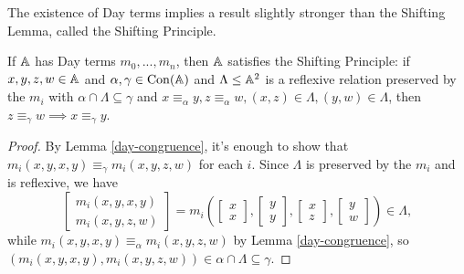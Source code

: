 \documentclass[letterpaper,11pt]{article}
\DeclareMathOperator{\Con}{Con}
\begin{document}
The existence of Day terms implies a result slightly stronger than the Shifting Lemma, called the Shifting Principle.

\begin{lem} If $\mathbb{A}$ has Day terms $m_0, ..., m_n$, then $\mathbb{A}$ satisfies the Shifting Principle: if $x,y,z,w \in \mathbb{A}$ and $\alpha,\gamma \in \Con(\bA)$ and $\Lambda \le \mathbb{A}^2$ is a reflexive relation preserved by the $m_i$ with $\alpha \cap \Lambda \subseteq \gamma$ and $x \equiv_\alpha y, z\equiv_\alpha w, (x,z)\in \Lambda, (y,w)\in \Lambda$, then $z \equiv_\gamma w \implies x \equiv_\gamma y$.
\begin{center}
\end{center}
\end{lem}
\begin{proof} By Lemma \ref{day-congruence}, it's enough to show that $m_i(x,y,x,y) \equiv_\gamma m_i(x,y,z,w)$ for each $i$. Since $\Lambda$ is preserved by the $m_i$ and is reflexive, we have
\[
\begin{bmatrix} m_i(x,y,x,y)\\ m_i(x,y,z,w)\end{bmatrix} = m_i\left(\begin{bmatrix} x\\ x\end{bmatrix}, \begin{bmatrix} y\\ y\end{bmatrix}, \begin{bmatrix} x\\ z\end{bmatrix}, \begin{bmatrix} y\\ w\end{bmatrix}\right) \in \Lambda,
\]
while $m_i(x,y,x,y) \equiv_\alpha m_i(x,y,z,w)$ by Lemma \ref{day-congruence}, so $(m_i(x,y,x,y),m_i(x,y,z,w)) \in \alpha \cap \Lambda \subseteq \gamma$.
\end{proof}
\end{document}
